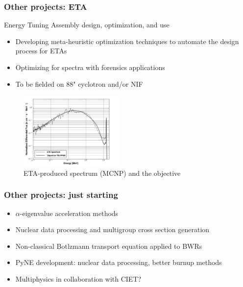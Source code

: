 \documentclass[xcolor=x11names,compress, handout]{beamer}
\renewcommand{\(}{\begin{columns}}
\renewcommand{\)}{\end{columns}}
\newcommand{\<}[1]{\begin{column}{#1}}
\renewcommand{\>}{\end{column}}
\begin{document}
\begin{frame}[fragile]
  \frametitle{Other projects: ETA}
  
Energy Tuning Assembly design, optimization, and use

  	\begin{itemize}
  	\item Developing meta-heuristic optimization techniques %
  	to automate the design process for ETAs
  	\item Optimizing for spectra with forensics applications
  	\item To be fielded on 88" cyclotron and/or NIF
	\end{itemize}	
	\begin{center}
 	 \begin{figure}
 	 \includegraphics[height=1.5in,clip]{ETA-Obj-100g}  
 	 \caption{ETA-produced spectrum (MCNP) and the objective}
 	 \end{figure}
 	\end{center}
  
\end{frame}	


\begin{frame}[fragile]
  \frametitle{Other projects: just starting}

  	\begin{itemize}
  	\item $\alpha$-eigenvalue acceleration methods 
  	\item Nuclear data processing and multigroup cross section generation
  	\item Non-classical Botlzmann transport equation applied to BWRs
  	\item PyNE development: nuclear data processing, better burnup methods  	
  	\item Multiphysics in collaboration with CIET?
	\end{itemize}	
  
\end{frame}
\end{document}
